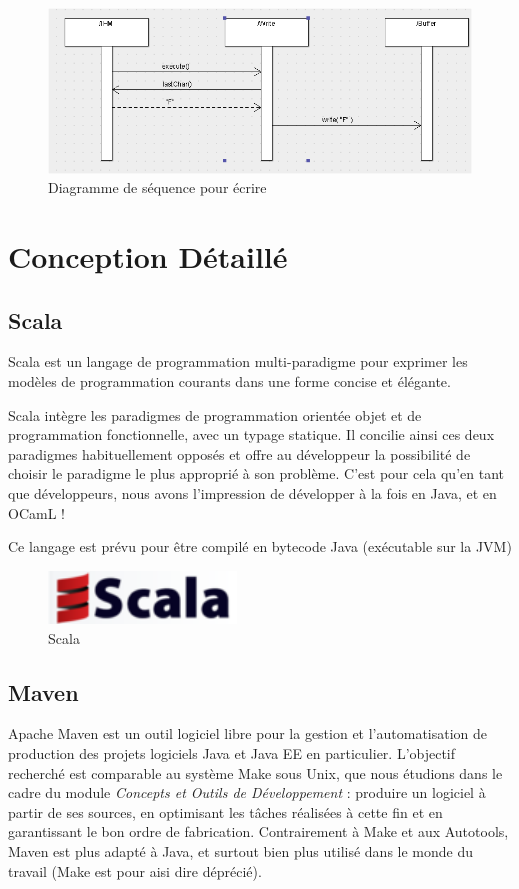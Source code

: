 \documentclass[a4paper,11pt]{article}
\begin{document}
\begin{figure}[!ht]
		\center
		\includegraphics [width=15cm]{./images/seq3.png}
		\caption{Diagramme de séquence pour écrire}
		\label{seq3}
\end{figure}

\section{Conception Détaillé}

\subsection{Scala}

Scala est un langage de programmation multi-paradigme pour exprimer les modèles de programmation courants dans une forme concise et élégante.

Scala intègre les paradigmes de programmation orientée objet et de programmation fonctionnelle, avec un typage statique. Il concilie ainsi ces deux paradigmes habituellement opposés et offre au développeur la possibilité de choisir le paradigme le plus approprié à son problème. C'est pour cela qu'en tant que développeurs, nous avons l'impression de développer à la fois en Java, et en OCamL !

Ce langage est prévu pour être compilé en bytecode Java (exécutable sur la JVM)

	\begin{figure}[!ht]
		\center
		\includegraphics [width=50mm]{./images/scala.png}
		\caption{Scala}
	\end{figure}
	

\subsection{Maven}
Apache Maven est un outil logiciel libre pour la gestion et l'automatisation de production des projets logiciels Java et Java EE en particulier. L'objectif recherché est comparable au système Make sous Unix, que nous étudions dans le cadre du module \textit{Concepts et Outils de Développement} : produire un logiciel à partir de ses sources, en optimisant les tâches réalisées à cette fin et en garantissant le bon ordre de fabrication. Contrairement à Make et aux Autotools, Maven est plus adapté à Java, et surtout bien plus utilisé dans le monde du travail (Make est pour aisi dire déprécié).
\end{document}
